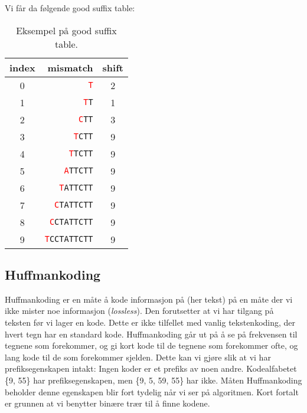 \vspace{10pt}

\noindent Vi får da følgende good suffix table:
\begin{table}[H]
\centering
\begin{tabular}{crc}
index&mismatch&shift\\
\hline
0&\texttt{\textcolor{red}{T}}&2\\
1&\texttt{\textcolor{red}{T}T}&1\\
2&\texttt{\textcolor{red}{C}TT}&3\\
3&\texttt{\textcolor{red}{T}CTT}&9\\
4&\texttt{\textcolor{red}{T}TCTT}&9\\
5&\texttt{\textcolor{red}{A}TTCTT}&9\\
6&\texttt{\textcolor{red}{T}ATTCTT}&9\\
7&\texttt{\textcolor{red}{C}TATTCTT}&9\\
8&\texttt{\textcolor{red}{C}CTATTCTT}&9\\
9&\texttt{\textcolor{red}{T}CCTATTCTT}&9\\
\end{tabular}
\caption{Eksempel på good suffix table.}
\label{tab:gst}
\end{table}

	\subsection{Huffmankoding}\label{huffman}
		Huffmankoding er en måte å kode informasjon på (her tekst) på en måte der vi ikke mister noe informasjon (\textit{lossless}). Den forutsetter at vi har tilgang på teksten før vi lager en kode. Dette er ikke tilfellet med vanlig tekstenkoding, der hvert tegn har en standard kode. Huffmankoding går ut på å se på frekvensen til tegnene som forekommer, og gi kort kode til de tegnene som forekommer ofte, og lang kode til de som forekommer sjelden. Dette kan vi gjøre slik at vi har prefiksegenskapen intakt: Ingen koder er et prefiks av noen andre. Kodealfabetet \{9, 55\} har prefiksegenskapen, men \{9, 5, 59, 55\} har ikke. Måten Huffmankoding beholder denne egenskapen blir fort tydelig når vi ser på algoritmen. Kort fortalt er grunnen at vi benytter binære trær til å finne kodene.
		
